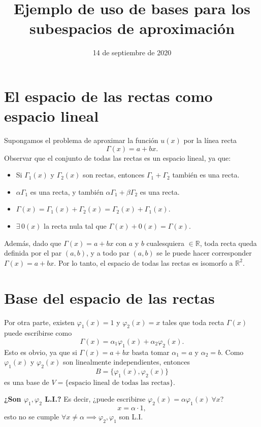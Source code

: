 \documentclass[11pt]{article}
\title{Ejemplo de uso de bases para los subespacios de aproximación}
\author{}
\date{14 de septiembre de 2020}
\begin{document}
\maketitle

\section{El espacio de las rectas como espacio lineal}

Supongamos el problema de aproximar la función $u(x)$ por la línea recta
\[
\Gamma(x) = a + bx.
\]
Observar que el conjunto de todas las rectas es un espacio lineal, ya que:
\begin{itemize}
    \item Si $\Gamma_1(x)$ y $\Gamma_2(x)$ son rectas, entonces $\Gamma_1 + \Gamma_2$ también es una recta.
    \item $\alpha \Gamma_1$ es una recta, y también $\alpha \Gamma_1 + \beta \Gamma_2$ es una recta.
    \item $\Gamma(x) = \Gamma_1(x) + \Gamma_2(x) = \Gamma_2(x) + \Gamma_1(x)$.
    \item $\exists\, 0(x)$ la recta nula tal que $\Gamma(x) + 0(x) = \Gamma(x)$.
\end{itemize}

Además, dado que $\Gamma(x) = a + bx$ con $a$ y $b$ cualesquiera $\in \mathbb{R}$, toda recta queda definida por el par $(a,b)$, y a todo par $(a,b)$ se le puede hacer corresponder $\Gamma(x) = a+bx$. Por lo tanto, el espacio de todas las rectas es isomorfo a $\mathbb{R}^2$.

\section{Base del espacio de las rectas}

Por otra parte, existen $\varphi_1(x) = 1$ y $\varphi_2(x) = x$ tales que toda recta $\Gamma(x)$ puede escribirse como
\[
\Gamma(x) = \alpha_1 \varphi_1(x) + \alpha_2 \varphi_2(x).
\]
Esto es obvio, ya que si $\Gamma(x) = a + bx$ basta tomar $\alpha_1 = a$ y $\alpha_2 = b$. Como $\varphi_1(x)$ y $\varphi_2(x)$ son linealmente independientes, entonces
\[
B = \{\varphi_1(x), \varphi_2(x)\}
\]
es una base de $V = \{\text{espacio lineal de todas las rectas}\}$.

\medskip
\noindent \textbf{¿Son $\varphi_1, \varphi_2$ L.I.?} Es decir, ¿puede escribirse $\varphi_2(x) = \alpha \varphi_1(x)\ \forall x$?
\[
x = \alpha \cdot 1,
\]
esto no se cumple $\forall x \neq \alpha \implies \varphi_2, \varphi_1$ son L.I.
\end{document}

